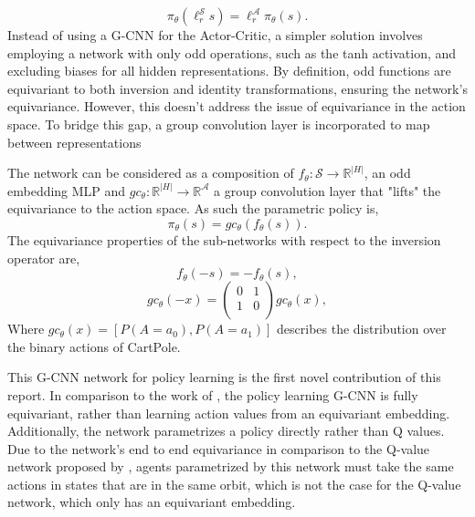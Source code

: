 \begin{equation}
	\pi_\theta(\ell^\mathcal{S}_r s) = \ell^\mathcal{A}_r \pi_\theta(s).
\end{equation}
Instead of using a G-CNN for the Actor-Critic, a simpler solution involves employing a network with only odd operations, such as the tanh activation, and excluding biases for all hidden representations. By definition, odd functions are equivariant to both inversion and identity transformations, ensuring the network's equivariance. However, this doesn't address the issue of equivariance in the action space. To bridge this gap, a group convolution layer is incorporated to map between representations

The network can be considered as a composition of $f_\theta : \mathcal{S} \rightarrow \mathbb{R}^{|H|}$, an odd embedding MLP and $gc_\theta: \mathbb{R}^{|H|} \rightarrow \mathbb{R}^{\mathcal{A}}$ a group convolution layer that "lifts" the equivariance to the action space. As such the parametric policy is,
\begin{equation}
	\pi_\theta(s) = gc_\theta(f_\theta(s)).
\end{equation}
The equivariance properties of the sub-networks with respect to the inversion operator are,
\begin{equation}
	f_\theta(-s) = -f_\theta(s),
\end{equation}
\begin{equation}
	gc_\theta(-x) =
	\begin{pmatrix}
		0 & 1 \\
		1 & 0 \\
	\end{pmatrix}
	gc_\theta(x),
\end{equation}
Where $gc_\theta(x) = [P(A=a_0), P(A=a_1)]$ describes the distribution over the binary actions of CartPole.

This G-CNN network for policy learning is the first novel contribution of this report. In comparison to the work of \cite{mondal2020group}, the policy learning G-CNN is fully equivariant, rather than learning action values from an equivariant embedding. Additionally, the network parametrizes a policy directly rather than Q values. Due to the network's end to end equivariance in comparison to the Q-value network proposed by \cite{mondal2020group}, agents parametrized by this network must take the same actions in states that are in the same orbit, which is not the case for the Q-value network, which only has an equivariant embedding.

